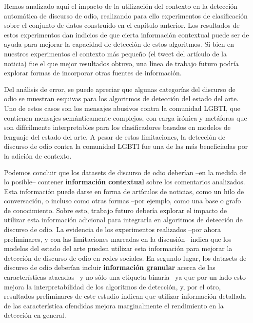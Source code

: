 Hemos analizado aquí el impacto de la utilización del contexto en la detección automática de discurso de odio, realizando para ello experimentos de clasificación sobre el conjunto de datos construido en el capítulo anterior. Los resultados de estos experimentos dan indicios de que cierta información contextual puede ser de ayuda para mejorar la capacidad de detección de estos algoritmos. Si bien en nuestros experimentos el contexto más pequeño (el tweet del artículo de la noticia) fue el que mejor resultados obtuvo, una línea de trabajo futuro podría explorar formas de incorporar otras fuentes de información.


Del análisis de error, se puede apreciar que algunas categorías del discurso de odio se muestran esquivas para los algoritmos de detección del estado del arte. Uno de estos casos son los mensajes abusivos contra la comunidad LGBTI, que contienen mensajes semánticamente complejos, con carga irónica y metáforas que son difícilmente interpretables para los clasificadores basados en modelos de lenguaje del estado del arte. A pesar de estas limitaciones, la detección de discurso de odio contra la comunidad LGBTI fue una de las más beneficiadas por la adición de contexto.

Podemos concluir que los datasets de discurso de odio deberían --en la medida de lo posible-- contener \textbf{información contextual} sobre los comentarios analizados. Esta información puede darse en forma de artículos de noticias, como un hilo de conversación, o incluso como otras formas --por ejemplo, como una base o grafo de conocimiento. Sobre esto, trabajo futuro debería explorar el impacto de utilizar esta información adicional para integrarla en algoritmos de detección de discurso de odio. La evidencia de los experimentos realizados --por ahora preliminares, y con las limitaciones marcadas en la discusión-- indica que los modelos del estado del arte pueden utilizar esta información para mejorar la detección de discurso de odio en redes sociales. En segundo lugar, los datasets de discurso de odio deberían incluir \textbf{información granular} acerca de las características atacadas --y no sólo una etiqueta binaria-- ya que por un lado esto mejora la interpretabilidad de los algoritmos de detección, y, por el otro, resultados preliminares de este estudio indican que utilizar información detallada de las característica ofendidas mejora marginalmente el rendimiento en la detección en general.


